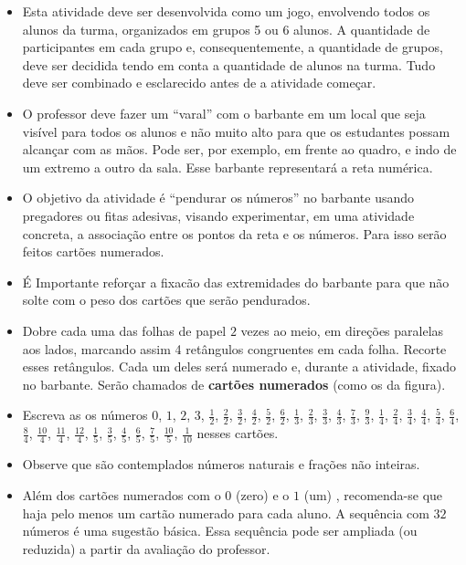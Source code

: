 \begin{multicols}{2}
\begin{itemize} %
  \item     Esta atividade deve ser desenvolvida como um jogo, envolvendo todos os alunos da turma, organizados em grupos  5 ou 6 alunos. A quantidade de participantes em cada grupo e, consequentemente, a quantidade de grupos, deve ser decidida tendo em conta a quantidade de alunos na turma. Tudo deve ser combinado e esclarecido antes de a atividade começar.
  \item     O professor deve fazer um  ``varal'' com o barbante em um local que seja visível para todos os alunos e não muito alto para que os estudantes possam alcançar com as mãos. Pode ser, por exemplo, em frente ao quadro, e indo de um extremo a outro da sala. Esse barbante representará a reta numérica. 
  \item O objetivo da atividade é ``pendurar os números'' no barbante usando pregadores ou fitas adesivas, visando experimentar, em uma atividade concreta, a associação entre os pontos da reta e os números. Para isso serão feitos cartões numerados. 
  \item É Importante reforçar a fixacão das extremidades do barbante para que não solte com o peso dos cartões que serão pendurados.
  \item Dobre cada uma das folhas de papel $2$ vezes ao meio, em direções paralelas aos lados, marcando assim 4 retângulos congruentes em cada folha. Recorte esses retângulos. Cada um deles será numerado e, durante a atividade, fixado no barbante. Serão chamados de {\bf cartões numerados} (como os da figura). 
  \item  Escreva as os números $0$, $1$, $2$, $3$, $\frac{1}{2}$, $\frac{2}{2}$, $\frac{3}{2}$, $\frac{4}{2}$, $\frac{5}{2}$, $\frac{6}{2}$, $\frac{1}{3}$, $\frac{2}{3}$, $\frac{3}{3}$, $\frac{4}{3}$, $\frac{7}{3}$, $\frac{9}{3}$, $\frac{1}{4}$, $\frac{2}{4}$, $\frac{3}{4}$, $\frac{4}{4}$, $\frac{5}{4}$, $\frac{6}{4}$, $\frac{8}{4}$, $\frac{10}{4}$, $\frac{11}{4}$, $\frac{12}{4}$, $\frac{1}{5}$, $\frac{3}{5}$, $\frac{4}{5}$, $\frac{6}{5}$, $\frac{7}{5}$, $\frac{10}{5}$, $\frac{1}{10}$ nesses cartões.
  \item Observe que são contemplados números naturais e frações não inteiras. 
  \item Além dos cartões numerados com o $0$ (zero) e o $1$ (um) , recomenda-se que haja pelo menos um cartão numerado para cada aluno. A sequência com $32$ números é uma sugestão básica. Essa sequência pode ser ampliada (ou reduzida) a partir da avaliação do professor. 
\end{itemize} %


\end{multicols}
